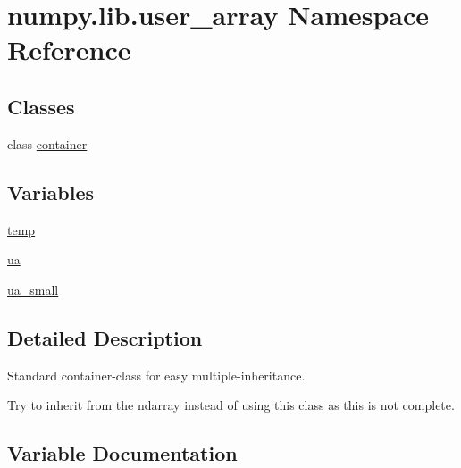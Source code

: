 \hypertarget{namespacenumpy_1_1lib_1_1user__array}{}\section{numpy.\+lib.\+user\+\_\+array Namespace Reference}
\label{namespacenumpy_1_1lib_1_1user__array}
\subsection*{Classes}
\begin{DoxyCompactItemize}
\item 
class \hyperlink{classnumpy_1_1lib_1_1user__array_1_1container}{container}
\end{DoxyCompactItemize}
\subsection*{Variables}
\begin{DoxyCompactItemize}
\item 
\hyperlink{namespacenumpy_1_1lib_1_1user__array_a7495574b5ce1ff298add4a1f9c8e903a}{temp}
\item 
\hyperlink{namespacenumpy_1_1lib_1_1user__array_a6ef1d973e58dd424c7af7cb2065e07ef}{ua}
\item 
\hyperlink{namespacenumpy_1_1lib_1_1user__array_a354a1c747c4cb1a904ef552577ca495b}{ua\+\_\+small}
\end{DoxyCompactItemize}


\subsection{Detailed Description}
\begin{DoxyVerb}Standard container-class for easy multiple-inheritance.

Try to inherit from the ndarray instead of using this class as this is not
complete.\end{DoxyVerb}
 

\subsection{Variable Documentation}
\mbox{\label{namespacenumpy_1_1lib_1_1user__array_a7495574b5ce1ff298add4a1f9c8e903a}} 
